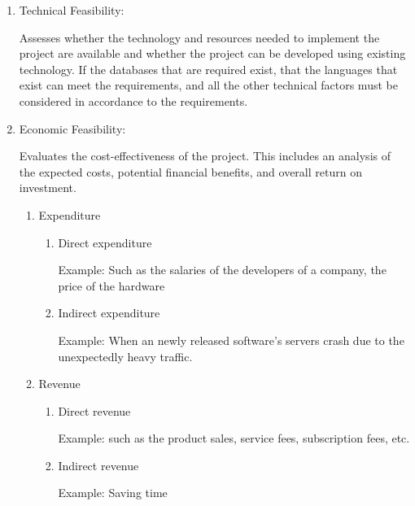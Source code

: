 \documentclass[a4paper]{article}
\begin{document}
\begin{enumerate}
    \item Technical Feasibility:

            Assesses whether the technology and resources needed to implement the project are available and whether the project can be developed using 
            existing technology. If the databases that are required exist, that the languages that exist can meet the requirements, and all the other
            technical factors must be considered in accordance to the requirements.

    \item Economic Feasibility:

            Evaluates the cost-effectiveness of the project. This includes an analysis of the expected costs, potential financial benefits, 
            and overall return on investment.

    \begin{enumerate}
        \item Expenditure
            
        \begin{enumerate}
            \item Direct expenditure 

                Example: Such as the salaries of the developers of a company, the price of the hardware

            \item Indirect expenditure

                Example: When an newly released software's servers crash due to the unexpectedly heavy traffic.  

        \end{enumerate}

        \item Revenue

        \begin{enumerate}
            \item Direct revenue

                Example: such as the product sales, service fees, subscription fees, etc.

            \item Indirect revenue

                Example: Saving time

        \end{enumerate}

    \end{enumerate}


\end{enumerate}
\end{document}
